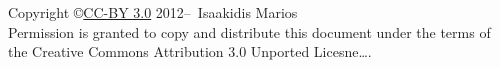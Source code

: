 \clearpage\null\vfill
\thispagestyle{empty}
\begin{center}
Copyright \copyright \href{https://creativecommons.org/licenses/by/3.0/}{CC-BY 3.0} 2012--\the\year\ Isaakidis Marios\\[0.5cm]
Permission is granted to copy and distribute this document under the terms of the Creative Commons Attribution 3.0 Unported Licesne\ldots.
\end{center}
\clearpage
